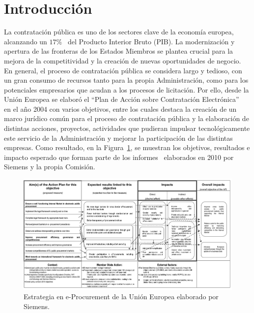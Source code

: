 \section{Introducción}
La contratación pública es uno de los sectores clave de la economía europea, alcanzando
un $17$\%~\cite{europeanStrategy} del Producto Interior Bruto (\gls{PIB}). La modernización y apertura de las fronteras de los \gls{Estados} Miembros se plantea
crucial para la mejora de la competitividad y la creación de nuevas oportunidades de negocio. En general,
el proceso de contratación pública se considera largo y tedioso, con un gran consumo de recursos
tanto para la propia Administración, como para los potenciales empresarios que acudan a los procesos
de licitación. Por ello, desde la Unión \gls{Europea} se elaboró el ``Plan de Acción sobre Contratación Electrónica''~\cite{plan2004} en el año 2004 con
varios objetivos, entre los cuales destaca la creación de un marco jurídico común para el proceso
de contratación pública y la elaboración de distintas acciones, proyectos, actividades que
pudieran impulsar tecnológicamente este servicio de la Administración y mejorar la participación
de las distintas empresas. Como resultado, en la Figura~\ref{fig:ted-2}, se muestran los objetivos, resultados e impacto
esperado que forman parte de los informes~\cite{siemensEval,euEval} elaborados en 2010 por Siemens y la propia Comisión.

\begin{figure}[!htb]
\centering
	\includegraphics[width=16cm]{images/phd/eproc/ted-2}
\caption{Estrategia en e-Procurement de la Unión Europea elaborado por Siemens.}
\label{fig:ted-2}
\end{figure}

